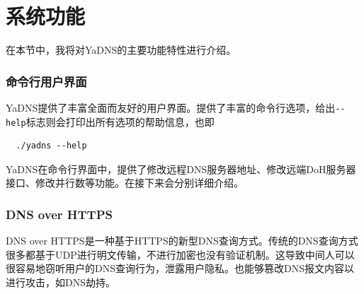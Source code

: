 \part{系统功能}

在本节中，我将对YaDNS的主要功能特性进行介绍。

\begin{figure}
	\centering
	\enspace
	\label{fig:feature-showoff}
\end{figure}

\section{命令行用户界面}

YaDNS提供了丰富全面而友好的用户界面。提供了丰富的命令行选项，给出\lstinline{--help}标志则会打印出所有选项的帮助信息，也即
\begin{verbatim}
  ./yadns --help
\end{verbatim}

YaDNS在命令行界面中，提供了修改远程DNS服务器地址、修改远端DoH服务器接口、修改并行数等功能。在接下来会分别详细介绍。

\section{DNS over HTTPS}

DNS over HTTPS是一种基于HTTPS的新型DNS查询方式。传统的DNS查询方式很多都基于UDP进行明文传输，不进行加密也没有验证机制。这导致中间人可以很容易地窃听用户的DNS查询行为，泄露用户隐私。也能够篡改DNS报文内容以进行攻击，如DNS劫持。

